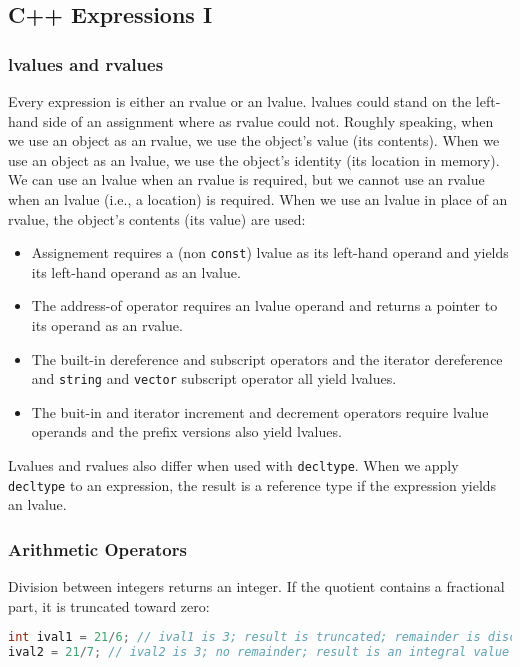 \subsection{C++ Expressions I}
\label{task:20231204_cpp}

\subsubsection{lvalues and rvalues}

Every expression is either an rvalue or an lvalue. lvalues could stand on the left-hand side of an assignment where as rvalue could not. Roughly speaking, when we use an object as an rvalue, we use the object's value (its contents). When we use an object as an lvalue, we use the object's identity (its location in memory). We can use an lvalue when an rvalue is required, but we cannot use an rvalue when an lvalue (i.e., a location) is required. When we use an lvalue in place of an rvalue, the object's contents (its value) are used:

\begin{itemize}
    \item Assignement requires a (non \texttt{const}) lvalue as its left-hand operand and yields its left-hand operand as an lvalue.
    \item The address-of operator requires an lvalue operand and returns a pointer to its operand as an rvalue.
    \item The built-in dereference and subscript operators and the iterator dereference and \texttt{string} and \texttt{vector} subscript operator all yield lvalues.
    \item The buit-in and iterator increment and decrement operators require lvalue operands and the prefix versions also yield lvalues.
\end{itemize}

Lvalues and rvalues also differ when used with \texttt{decltype}. When we apply \texttt{decltype} to an expression, the result is a reference type if the expression yields an lvalue.


\subsubsection{Arithmetic Operators}

Division between integers returns an integer. If the quotient contains a fractional part, it is truncated toward zero:
\begin{lstlisting}[language=C++]
int ival1 = 21/6; // ival1 is 3; result is truncated; remainder is discarded int 
ival2 = 21/7; // ival2 is 3; no remainder; result is an integral value
\end{lstlisting}

